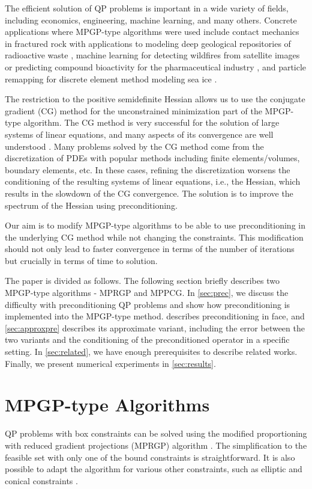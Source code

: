 \documentclass[11pt]{article}
\theoremstyle{plain}
\theoremstyle{definition}
\begin{document}
The efficient solution of QP problems is important in a wide variety of fields, including economics, engineering, machine learning, and many others.
Concrete applications where MPGP-type algorithms were used include contact mechanics in fractured rock \cite{Stebel2024} with applications to modeling deep geological repositories of radioactive waste \cite{Claret2024}, machine learning for detecting wildfires from satellite images \cite{PechaPhD} or predicting compound bioactivity for the pharmaceutical industry \cite{Kruzik2018-svm}, and particle remapping for discrete element method modeling sea ice \cite{Turner2022}.

The restriction to the positive semidefinite Hessian allows us to use the conjugate gradient (CG) method for the unconstrained minimization part of the MPGP-type algorithm.
The CG method is very successful for the solution of large systems of linear equations, and many aspects of its convergence are well understood \cite{LiesenStrakos2012}.
Many problems solved by the CG method come from the discretization of PDEs with popular methods including finite elements/volumes, boundary elements, etc.
In these cases, refining the discretization worsens the conditioning of the resulting systems of linear equations, i.e., the Hessian, which results in the slowdown of the CG convergence.
The solution is to improve the spectrum of the Hessian using preconditioning.

Our aim is to modify MPGP-type algorithms to be able to use preconditioning in the underlying CG method while not changing the constraints.
This modification should not only lead to faster convergence in terms of the number of iterations but crucially in terms of time to solution.

The paper is divided as follows.
The following section briefly describes two MPGP-type algorithms - MPRGP and MPPCG.
In \cref{sec:prec}, we discuss the difficulty with preconditioning QP problems and show how preconditioning is implemented into the MPGP-type method.
 describes preconditioning in face, and \cref{sec:approxpre} describes its approximate variant, including the error between the two variants and the conditioning of the preconditioned operator in a specific setting.
In \cref{sec:related}, we have enough prerequisites to describe related works.
Finally, we present numerical experiments in \cref{sec:results}.

\section{MPGP-type Algorithms}
\label{sec:mprgp}
QP problems with box constraints can be solved using the modified proportioning with reduced gradient projections (MPRGP) algorithm \cite{Dostal2005,Dos-book-09}.
The simplification to the feasible set with only one of the bound constraints is straightforward.
It is also possible to adapt the algorithm for various other constraints, such as elliptic and conical constraints \cite{Bouchala2014,PospisilPhD}.
\end{document}
